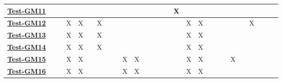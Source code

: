 \documentclass[12pt, titlepage]{article}
\begin{document}
\begin{landscape}
\begin{table}[H]
\begin{adjustwidth}{-0.0in}{-1in}
{\begin{tabular}{l|l|l|l|l|l|l|l|l|l|l|l|l|l|l|l|l|l|l|l|l|l|l|l|l|l|l|}
\multicolumn{1}{|l|}{\hyperref[Test-GM11]{\textbf{Test-GM11}}}&              &              &             &         &              &           &              &              &              &               &               &               &               &               &           X  &              &              &               &               &               &               &               &           &             &             &             \\ \hline
\multicolumn{1}{|l|}{\hyperref[Test-GM12]{\textbf{Test-GM12}}}&              &              & X            & X            &              & X            &              &              &              &               &               &               &               &               &               & X             & X             &               &               &               &               &               & X           &             &             &             \\ \hline
\multicolumn{1}{|l|}{\hyperref[Test-GM13]{\textbf{Test-GM13}}} &              &              & X            & X            &              & X            &              &              &              &               &               &               &               &               &               & X             & X             &               &               &               &               &               &             &             &             &             \\ \hline
\multicolumn{1}{|l|}{\hyperref[Test-GM14]{\textbf{Test-GM14}}} &              &              & X            & X            &              & X            &              &              &              &               &               &               &               &               &               & X             & X             &               &               &               &               &               &             &             &             &             \\ \hline
\multicolumn{1}{|l|}{\hyperref[Test-GM15]{\textbf{Test-GM15}}}&              &              & X            & X            &              &              &              &              & X            & X             &               &               &               &               &               & X             & X             &               &               &               & X             &               &             &             &             &             \\ \hline
\multicolumn{1}{|l|}{\hyperref[Test-GM16]{\textbf{Test-GM16}}} &              &              & X            & X            &              &              &              &              & X            & X             &               &               &               &               &               & X             & X             &               &               &               &               &               &             &             &             &             \\ \hline

\end{tabular}}
\end{adjustwidth}
\end{table}
\end{landscape}
\end{document}
